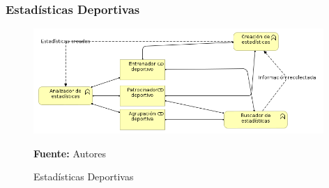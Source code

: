 \subsubsection{Estadísticas Deportivas}

\begin{figure}[!htb]
  \begin{center}
    \includegraphics[width=11cm]{./imagenes/business_functions/estadisticasdeportivas.png}
    \caption{Estadísticas Deportivas}
    \label{fig:bf_estadisticas_deportivas}
    \textbf{Fuente:}  Autores
  \end{center}
\end{figure}

